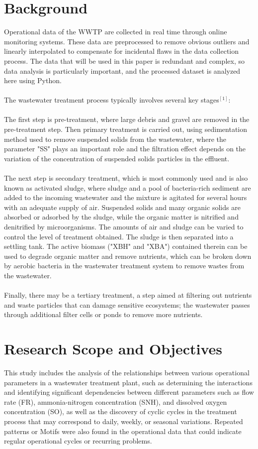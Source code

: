 \documentclass[]{iat}
\begin{document}
\section{Background}
Operational data of the WWTP are collected in real time through online monitoring systems. These data are preprocessed to remove obvious outliers and linearly interpolated to compensate for incidental flaws in the data collection process. The data that will be used in this paper is redundant and complex, so data analysis is particularly important, and the processed dataset is analyzed here using Python.\\
\\
The wastewater treatment process typically involves several key stages$^{[1]}$:\\
\\
The first step is pre-treatment, where large debris and gravel are removed in the pre-treatment step. Then primary treatment is carried out, using sedimentation method used to remove suspended solids from the wastewater, where the parameter "SS" plays an important role and the filtration effect depends on the variation of the concentration of suspended solids particles in the effluent.\\
\\
The next step is secondary treatment, which is most commonly used and is also known as activated sludge, where sludge and a pool of bacteria-rich sediment are added to the incoming wastewater and the mixture is agitated for several hours with an adequate supply of air. Suspended solids and many organic solids are absorbed or adsorbed by the sludge, while the organic matter is nitrified and denitrified by microorganisms. The amounts of air and sludge can be varied to control the level of treatment obtained. The sludge is then separated into a settling tank. The active biomass ("XBH" and "XBA") contained therein can be used to degrade organic matter and remove nutrients, which can be broken down by aerobic bacteria in the wastewater treatment system to remove wastes from the wastewater.\\
\\
Finally, there may be a tertiary treatment, a step aimed at filtering out nutrients and waste particles that can damage sensitive ecosystems; the wastewater passes through additional filter cells or ponds to remove more nutrients.
\section{Research Scope and Objectives}
This study includes the analysis of the relationships between various operational parameters in a wastewater treatment plant, such as determining the interactions and identifying significant dependencies between different parameters such as flow rate (FR), ammonia-nitrogen concentration (SNH), and dissolved oxygen concentration (SO), as well as the discovery of cyclic cycles in the treatment process that may correspond to daily, weekly, or seasonal variations. Repeated patterns or Motifs were also found in the operational data that could indicate regular operational cycles or recurring problems.
\end{document}
